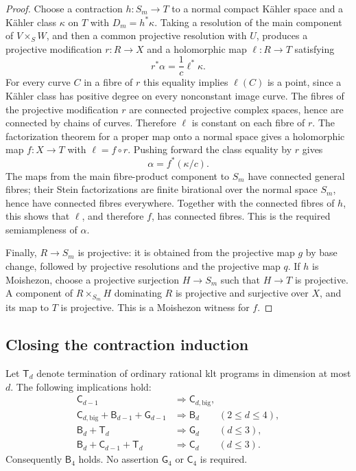 \begin{proof}
Choose a contraction $h:S_m\to T$ to a normal compact K\"ahler space
and a K\"ahler class $\kappa$ on $T$ with $D_m=h^*\kappa$. Taking a
resolution of the main component of $V\times_S W$, and then a common
projective resolution with $U$, produces a projective modification
$r:R\to X$ and a holomorphic map $\ell:R\to T$ satisfying
\[
                         r^*\alpha=\frac1c\ell^*\kappa.
\]
For every curve $C$ in a fibre of $r$ this equality implies
$\ell(C)$ is a point, since a K\"ahler class has positive degree on
every nonconstant image curve. The fibres of the projective modification
$r$ are connected projective complex spaces, hence are connected by
chains of curves. Therefore $\ell$ is
constant on each fibre of $r$. The factorization theorem for a proper
map onto a normal space gives a holomorphic map $f:X\to T$ with
$\ell=f\circ r$. Pushing forward the class equality by $r$ gives
\[
                              \alpha=f^*(\kappa/c).
\]
The maps from the main fibre-product component to $S_m$ have connected
general fibres; their Stein factorizations are finite birational over
the normal space $S_m$, hence have connected fibres everywhere.
Together with the connected fibres of $h$, this shows that $\ell$,
and therefore $f$, has connected fibres. This is the required
semiampleness of $\alpha$.

Finally, $R\to S_m$ is projective: it is obtained from the projective
map $g$ by base change, followed by projective resolutions and the
projective map $q$. If $h$ is Moishezon, choose a projective surjection
$H\to S_m$ such that $H\to T$ is projective. A component of
$R\times_{S_m}H$ dominating $R$ is projective and surjective over $X$,
and its map to $T$ is projective. This is a Moishezon witness for $f$.
\end{proof}


\subsection{Closing the contraction induction}
\begin{proposition}
\label{repair:prop:restricted-bpf-induction}
Let $\mathsf T_d$ denote termination of ordinary rational klt
programs in dimension at most $d$. The following implications hold:
\begin{align*}
 \mathsf C_{d-1}&\Longrightarrow\mathsf C_{d,\mathrm{big}},\\
 \mathsf C_{d,\mathrm{big}}+\mathsf B_{d-1}+\mathsf G_{d-1}
   &\Longrightarrow\mathsf B_d \qquad (2\leq d\leq4),\\
 \mathsf B_d+\mathsf T_d
   &\Longrightarrow\mathsf G_d \qquad (d\leq3),\\
 \mathsf B_d+\mathsf C_{d-1}+\mathsf T_d
   &\Longrightarrow\mathsf C_d \qquad (d\leq3).
\end{align*}
Consequently $\mathsf B_4$ holds. No assertion $\mathsf G_4$ or
$\mathsf C_4$ is required.
\end{proposition}

